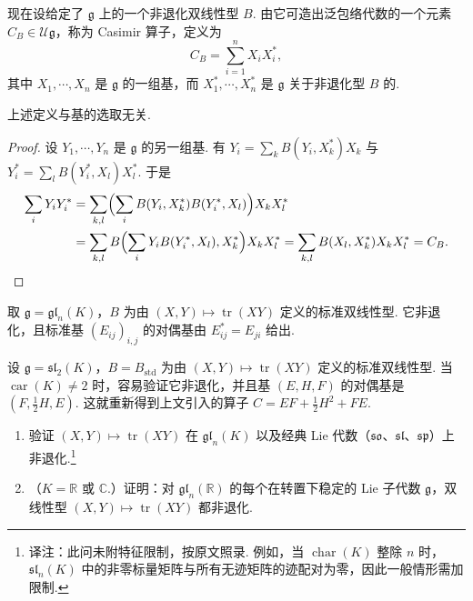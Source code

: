 \begin{numpara}[非退化不变双线性型]\label{np:ssl-2-3-3}
现在设给定了 $\mathfrak g$ 上的一个非退化双线性型 $B$. 由它可造出泛包络代数的一个元素 $C_{B} \in \mathcal{U}\mathfrak g$，称为 Casimir 算子，定义为
\[C_{B} = \sum_{i=1}^{n} X_{i} X_{i}^{*},\]
其中 $X_{1}, \cdots, X_{n}$ 是 $\mathfrak g$ 的一组基，而 $X_{1}^{*}, \cdots, X_{n}^{*}$ 是 $\mathfrak g$ 关于非退化型 $B$ 的.
\begin{lemma*}
上述定义与基的选取无关.
\end{lemma*}
\begin{proof}
设 $Y_{1}, \cdots, Y_{n}$ 是 $\mathfrak g$ 的另一组基. 有 $Y_{i} = \sum_{k} B(Y_{i}, X_{k}^{*}) X_{k}$ 与 $Y_{i}^{*} = \sum_{l} B(Y_{i}^{*}, X_{l}) X_{l}^{*}$. 于是
\begin{align*}
\sum_{i} Y_{i} Y_{i}^{*} &= \sum_{k,l} \Bigl( \sum_{i} B(Y_{i}, X_{k}^{*}) B(Y_{i}^{*}, X_{l}) \Bigr) X_{k} X_{l}^{*}\\
&= \sum_{k,l} B\Bigl( \sum_{i} Y_{i} B(Y_{i}^{*}, X_{l}), X_{k}^{*} \Bigr) X_{k} X_{l}^{*} = \sum_{k,l} B(X_{l}, X_{k}^{*}) X_{k} X_{l}^{*} = C_{B}.
\end{align*}
\end{proof}
\end{numpara}
\begin{example*}
取 $\mathfrak g=\mathfrak{gl}_n(K)$，$B$ 为由 $(X,Y)\mapsto\operatorname{tr}(XY)$ 定义的标准双线性型. 它非退化，且标准基 $(E_{ij})_{i,j}$ 的对偶基由 $E_{ij}^*=E_{ji}$ 给出.
\end{example*}
\begin{example*}
设 $\mathfrak g=\mathfrak{sl}_2(K)$，$B=B_{\mathrm{std}}$ 为由 $(X,Y)\mapsto\operatorname{tr}(XY)$ 定义的标准双线性型. 当 $\operatorname{car}(K)\neq2$ 时，容易验证它非退化，并且基 $(E,H,F)$ 的对偶基是 $(F,\tfrac12H,E)$. 这就重新得到上文引入的算子 $C=EF+\tfrac12H^2+FE$.
\end{example*}
\begin{exercise*}
\begin{enumerate}[label=\roman*)]
\item 验证 $(X,Y)\mapsto\operatorname{tr}(XY)$ 在 $\mathfrak{gl}_n(K)$ 以及经典 Lie 代数（$\mathfrak{so}$、$\mathfrak{sl}$、$\mathfrak{sp}$）上非退化.\footnote{译注：此问未附特征限制，按原文照录. 例如，当 $\operatorname{char}(K)$ 整除 $n$ 时，$\mathfrak{sl}_n(K)$ 中的非零标量矩阵与所有无迹矩阵的迹配对为零，因此一般情形需加限制.}
\item （$K=\mathbb R$ 或 $\mathbb C$.）证明：对 $\mathfrak{gl}_n(\mathbb R)$ 的每个在转置下稳定的 Lie 子代数 $\mathfrak g$，双线性型 $(X,Y)\mapsto\operatorname{tr}(XY)$ 都非退化.
\end{enumerate}
\end{exercise*}
